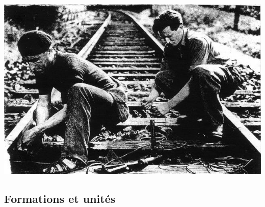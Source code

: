 \documentclass{article}
\begin{document}
\includegraphics[width=\linewidth]{../ressources/sabotage_maquisards}
\cite{fort_lupin,war,turtle_form,mongol_cavalery,sabotage}


\subsection{Formations et unités}
\end{document}
